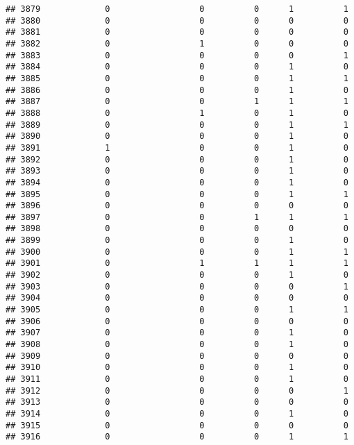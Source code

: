\documentclass[
]{article}
\begin{document}
\begin{verbatim}
## 3879             0                  0          0      1          1
## 3880             0                  0          0      0          0
## 3881             0                  0          0      0          0
## 3882             0                  1          0      0          0
## 3883             0                  0          0      0          1
## 3884             0                  0          0      1          0
## 3885             0                  0          0      1          1
## 3886             0                  0          0      1          0
## 3887             0                  0          1      1          1
## 3888             0                  1          0      1          0
## 3889             0                  0          0      1          1
## 3890             0                  0          0      1          0
## 3891             1                  0          0      1          0
## 3892             0                  0          0      1          0
## 3893             0                  0          0      1          0
## 3894             0                  0          0      1          0
## 3895             0                  0          0      1          1
## 3896             0                  0          0      0          0
## 3897             0                  0          1      1          1
## 3898             0                  0          0      0          0
## 3899             0                  0          0      1          0
## 3900             0                  0          0      1          1
## 3901             0                  1          1      1          1
## 3902             0                  0          0      1          0
## 3903             0                  0          0      0          1
## 3904             0                  0          0      0          0
## 3905             0                  0          0      1          1
## 3906             0                  0          0      0          0
## 3907             0                  0          0      1          0
## 3908             0                  0          0      1          0
## 3909             0                  0          0      0          0
## 3910             0                  0          0      1          0
## 3911             0                  0          0      1          0
## 3912             0                  0          0      0          1
## 3913             0                  0          0      0          0
## 3914             0                  0          0      1          0
## 3915             0                  0          0      0          0
## 3916             0                  0          0      1          1

\end{verbatim}
\end{document}
